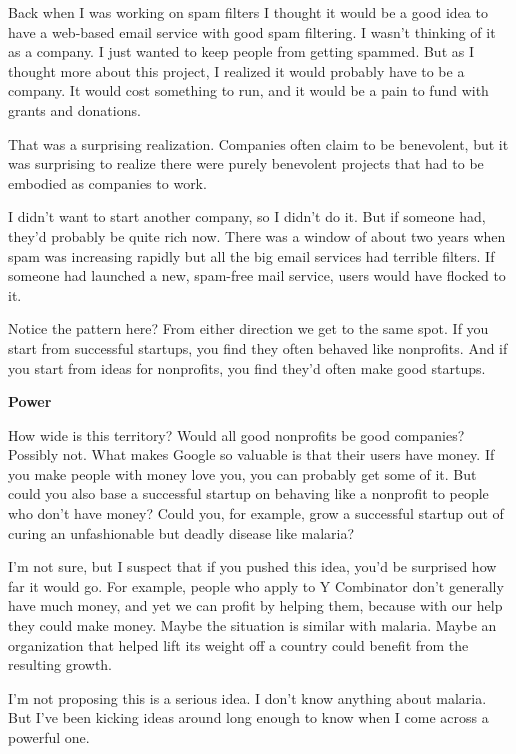 \documentclass[12pt]{book}
\begin{document}
Back when I was working on spam filters I thought it would be a good
idea to have a web-based email service with good spam filtering. I
wasn't thinking of it as a company. I just wanted to keep people from
getting spammed. But as I thought more about this project, I realized it
would probably have to be a company. It would cost something to run, and
it would be a pain to fund with grants and donations.

That was a surprising realization. Companies often claim to be
benevolent, but it was surprising to realize there were purely
benevolent projects that had to be embodied as companies to work.

I didn't want to start another company, so I didn't do it. But if
someone had, they'd probably be quite rich now. There was a window of
about two years when spam was increasing rapidly but all the big email
services had terrible filters. If someone had launched a new, spam-free
mail service, users would have flocked to it.

Notice the pattern here? From either direction we get to the same spot.
If you start from successful startups, you find they often behaved like
nonprofits. And if you start from ideas for nonprofits, you find they'd
often make good startups.

\textbf{Power}

How wide is this territory? Would all good nonprofits be good companies?
Possibly not. What makes Google so valuable is that their users have
money. If you make people with money love you, you can probably get some
of it. But could you also base a successful startup on behaving like a
nonprofit to people who don't have money? Could you, for example, grow a
successful startup out of curing an unfashionable but deadly disease
like malaria?

I'm not sure, but I suspect that if you pushed this idea, you'd be
surprised how far it would go. For example, people who apply to Y
Combinator don't generally have much money, and yet we can profit by
helping them, because with our help they could make money. Maybe the
situation is similar with malaria. Maybe an organization that helped
lift its weight off a country could benefit from the resulting growth.

I'm not proposing this is a serious idea. I don't know anything about
malaria. But I've been kicking ideas around long enough to know when I
come across a powerful one.
\end{document}
